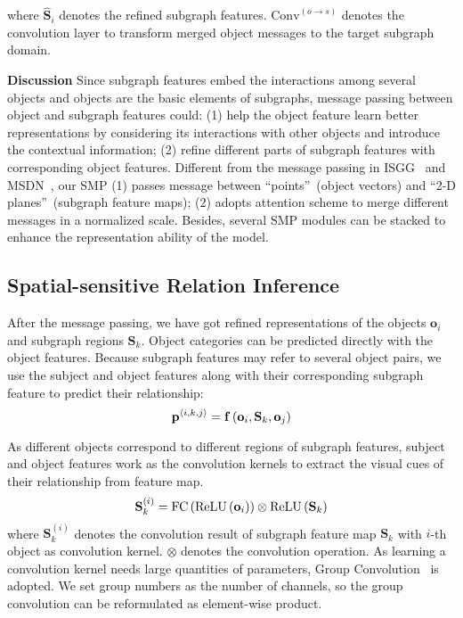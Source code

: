 \documentclass[runningheads]{llncs}
\begin{document}
\noindent where $\hat{\mathbf{S}}_i$ denotes the refined subgraph features. $\textrm{Conv}^{\left(o\rightarrow s\right)}$ denotes the convolution layer to transform merged object messages to the target subgraph domain. 

\noindent\textbf{Discussion} Since subgraph features embed the interactions among several objects and objects are the basic elements of subgraphs, message passing between object and subgraph features could: (1) help the object feature learn better representations by considering its interactions with other objects and introduce the contextual information; (2) refine different parts of subgraph features with corresponding object features. 
Different from the message passing in ISGG~\cite{xu2017scene} and MSDN~\cite{li2017scene}, our SMP (1) passes message between ``points''~(object vectors) and ``2-D planes''~(subgraph feature maps); (2) adopts attention scheme to merge different messages in a normalized scale. 
Besides, several SMP modules can be stacked to enhance the representation ability of the model. 

\subsection{Spatial-sensitive Relation Inference}

After the message passing, we have got refined representations of the objects $\mathbf{o}_i$ and subgraph regions $\mathbf{S}_k$. Object categories can be predicted directly with the object features. Because subgraph features may refer to several object pairs, we use the subject and object features along with their corresponding subgraph feature to predict their relationship:
\begin{equation}\small
\mathbf{p}^{\langle i,k,j\rangle} = \mathbf{f}\left(\mathbf{o}_i, \mathbf{S}_k, \mathbf{o}_j\right)
\label{eq:predicate}
\end{equation}

As different objects correspond to different regions of subgraph features, 
subject and object features work as the convolution kernels to extract the visual cues of their relationship from feature map. 
\begin{equation}\small
\mathbf{S}^{(i)}_{k} = \mathrm{FC}\left(\mathrm{ReLU}\left(\mathbf{o}_i\right)\right) \otimes \mathrm{ReLU}\left(\mathbf{S}_k\right)
\label{eq:conv_s}
\end{equation}
\noindent where $\mathbf{S}^{(i)}_{k}$ denotes the convolution result of subgraph feature map $\mathbf{S}_k$ with $i$-th object as convolution kernel. $\otimes$ denotes the convolution operation. As learning a convolution kernel needs large quantities of parameters, Group Convolution~\cite{imagenet_hinton} is adopted. We set group numbers as the number of channels, so the group convolution can be reformulated as element-wise product. 
\end{document}
